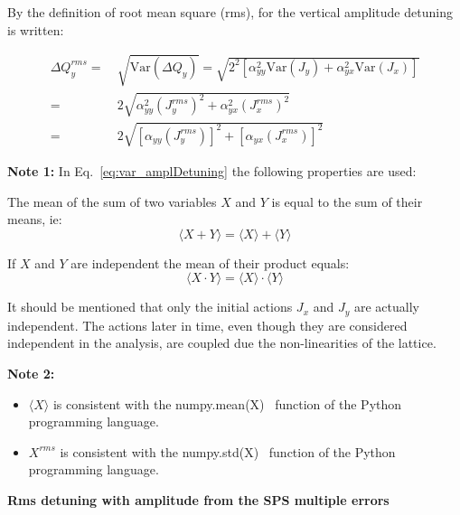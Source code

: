 By the definition of root mean square (rms), for the vertical amplitude detuning is written:

\begin{equation}\label{rms_amplitude_detuning}
    \begin{split}
    \Delta Q^{rms}_y = &~\sqrt{\mathrm{Var}(\Delta Q_y)}=\sqrt{2^2\left [ \alpha_{yy}^2 \mathrm{Var}(J_y) + \alpha_{yx}^2 \mathrm{Var}(J_x) \right ]}\\
    =&~2 \sqrt{\alpha_{yy}^2 (J^{rms}_y)^2 + \alpha_{yx}^2 (J^{rms}_x)^2 }\\
    =&~2 \sqrt{\left [\alpha_{yy} (J^{rms}_y)\right ]^2 + \left [ \alpha_{yx} (J^{rms}_x) \right ]^2 }
    \end{split}
\end{equation}

\textbf{Note 1:} In Eq.~\ref{eq:var_amplDetuning} the following properties are used:

The mean of the sum of two variables $X$ and $Y$ is equal to the sum of their means, ie:
\begin{equation}\label{eq:mean_of_sum_property}
    \langle X+Y \rangle = \langle X \rangle + \langle Y \rangle
\end{equation}

If $X$ and $Y$ are independent the mean of their product equals:
\begin{equation}\label{eq:mean_of_product_property}
    \langle X \cdot Y \rangle = \langle X \rangle \cdot  \langle Y \rangle
\end{equation}

It should be mentioned that only the initial actions $J_x$ and $J_y$ are actually independent. The actions later in time, even though they are considered independent in the analysis, are coupled due the non-linearities of the lattice.

\textbf{Note 2:}
\begin{itemize}
    \item $\langle X \rangle$ is consistent with the numpy.mean(X)~\cite{numpy_mean} function of the Python programming language.
    \item $X^{rms}$ is consistent with the numpy.std(X)~\cite{numpy_std} function of the Python programming language. 
\end{itemize}



\normalsize{\textbf{Rms detuning with amplitude from the SPS multiple errors}}\\
